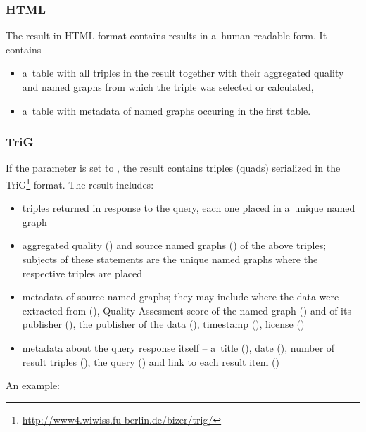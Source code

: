 \subsubsection{HTML}

The result in HTML format contains results in a~human-readable form. It contains

\begin{itemize}
	\item a~table with all triples in the result together with their aggregated quality and named graphs from which the triple was selected or calculated,
  \item  a~table with metadata of named graphs occuring in the first table.
\end{itemize}

\subsubsection{TriG}
\label{sec:URIKWTrig}

If the  parameter is set to , the result contains triples (quads) serialized in the TriG\footnote{\url{http://www4.wiwiss.fu-berlin.de/bizer/trig/}} format. The result includes:

\begin{itemize}
	\item triples returned in response to the query, each one placed in a~unique named graph
  \item aggregated quality () and source named graphs () of the above triples; subjects of these statements are the unique named graphs where the respective triples are placed
  \item  metadata of source named graphs; they may include where the data were extracted from (), Quality Assesment score of the named graph () and of its publisher (), the publisher of the data (), timestamp (), license ()
  \item  metadata about the query response itself -- a~title (), date (), number of result triples (), the query () and link to each result item ()
\end{itemize}

\pagebreak[3]

An example:

